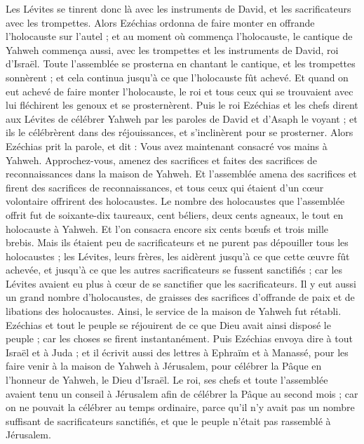 \begin{multicols}{2}
Les Lévites se tinrent donc là avec les instruments de David, et les sacrificateurs avec les trompettes.
Alors Ezéchias ordonna de faire monter en offrande l'holocauste sur l'autel ; et au moment où commença l'holocauste, le cantique de Yahweh commença aussi, avec les trompettes et les instruments de David, roi d'Israël.
Toute l'assemblée se prosterna en chantant le cantique, et les trompettes sonnèrent ; et cela continua jusqu'à ce que l'holocauste fût achevé.
Et quand on eut achevé de faire monter l'holocauste, le roi et tous ceux qui se trouvaient avec lui fléchirent les genoux et se prosternèrent.
Puis le roi Ezéchias et les chefs dirent aux Lévites de célébrer Yahweh par les paroles de David et d'Asaph le voyant ; et ils le célébrèrent dans des réjouissances, et s'inclinèrent pour se prosterner.
Alors Ezéchias prit la parole, et dit : Vous avez maintenant consacré vos mains à Yahweh. Approchez-vous, amenez des sacrifices et faites des sacrifices de reconnaissances dans la maison de Yahweh. Et l'assemblée amena des sacrifices et firent des sacrifices de reconnaissances, et tous ceux qui étaient d'un cœur volontaire offrirent des holocaustes.
Le nombre des holocaustes que l'assemblée offrit fut de soixante-dix taureaux, cent béliers, deux cents agneaux, le tout en holocauste à Yahweh.
Et l'on consacra encore six cents bœufs et trois mille brebis.
Mais ils étaient peu de sacrificateurs et ne purent pas dépouiller tous les holocaustes ; les Lévites, leurs frères, les aidèrent jusqu'à ce que cette œuvre fût achevée, et jusqu'à ce que les autres sacrificateurs se fussent sanctifiés ; car les Lévites avaient eu plus à cœur de se sanctifier que les sacrificateurs.
Il y eut aussi un grand nombre d'holocaustes, de graisses des sacrifices d'offrande de paix et de libations des holocaustes. Ainsi, le service de la maison de Yahweh fut rétabli.
Ezéchias et tout le peuple se réjouirent de ce que Dieu avait ainsi disposé le peuple ; car les choses se firent instantanément.
\VerseOne{}Puis Ezéchias envoya dire à tout Israël et à Juda ; et il écrivit aussi des lettres à Ephraïm et à Manassé, pour les faire venir à la maison de Yahweh à Jérusalem, pour célébrer la Pâque en l'honneur de Yahweh, le Dieu d'Israël.
Le roi, ses chefs et toute l'assemblée avaient tenu un conseil à Jérusalem afin de célébrer la Pâque au second mois ;
car on ne pouvait la célébrer au temps ordinaire, parce qu'il n'y avait pas un nombre suffisant de sacrificateurs sanctifiés, et que le peuple n'était pas rassemblé à Jérusalem.

\end{multicols}
